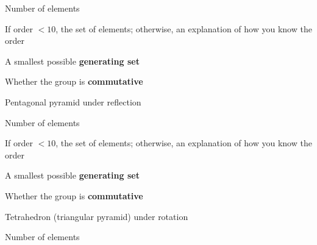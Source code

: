 \documentclass[../gatm_answers.tex]{subfiles}
\begin{document}
\begin{inner_problem}[start=1]
\item Number of elements
\end{inner_problem}

\begin{inner_problem}
\item If order $< 10$, the set of elements; otherwise, an explanation of how you know the order
\end{inner_problem}

\begin{inner_problem}
\item A smallest possible \textbf{generating set}
\end{inner_problem}

\begin{inner_problem}
\item Whether the group is \textbf{commutative}
\end{inner_problem}

\begin{outer_problem}
\item Pentagonal pyramid under reflection
\end{outer_problem}

\begin{inner_problem}[start=1]
\item Number of elements
\end{inner_problem}

\begin{inner_problem}
\item If order $< 10$, the set of elements; otherwise, an explanation of how you know the order
\end{inner_problem}

\begin{inner_problem}
\item A smallest possible \textbf{generating set}
\end{inner_problem}

\begin{inner_problem}
\item Whether the group is \textbf{commutative}
\end{inner_problem}

\begin{outer_problem}
\item Tetrahedron (triangular pyramid) under rotation
\end{outer_problem}

\begin{inner_problem}[start=1]
\item Number of elements
\end{inner_problem}
\end{document}
